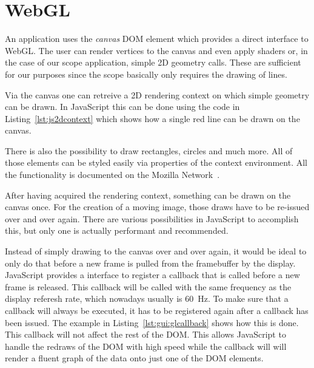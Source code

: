 \section{WebGL} %
\label{sec:app:gui:webgl}

An  application uses  the \emph{canvas}  DOM element  which provides  a direct
interface to WebGL. The user can render  vertices to the canvas and even apply
shaders  or,  in  the  case  of our  scope  application,  simple  2D  geometry
calls. These are  sufficient for our  purposes since the scope  basically only
requires the drawing of lines.

Via  the canvas  one  can retreive  a  2D rendering  context  on which  simple
geometry can  be drawn.   In JavaScript  this can  be done  using the  code in
Listing~\ref{lst:js2dcontext} which shows  how a single red line  can be drawn
on the canvas.


There  is  also   the  possibility  to  draw  rectangles,   circles  and  much
more. All  of those  elements  can  be styled  easily  via  properties of  the
context  environment. All  the  functionality  is documented  on  the  Mozilla
Network~\cite{moz:2dcontext}.

After having  acquired the rendering  context, something  can be drawn  on the
canvas once.   For the  creation of  a moving  image, those  draws have  to be
re-issued over and  over again. There are various  possibilities in JavaScript
to accomplish this, but only one is actually performant and recommended.

Instead of simply drawing to the canvas over and over again, it would be ideal
to only  do that  before a  new frame is  pulled from  the framebuffer  by the
display. JavaScript provides a interface to register a callback that is called
before  a  new frame  is  released. This  callback  will  be called  with  the
same  frequency  as the  display  referesh  rate,  which nowadays  usually  is
\SI{60}{\hertz}.  To make sure that a callback will always be executed, it has
to  be registered  again  after a  callback has  been  issued. The example  in
Listing~\ref{lst:gui:glcallback} shows  how this is done.   This callback will
not affect the  rest of the DOM. This allows JavaScript  to handle the redraws
of the DOM with high speed while  the callback will will render a fluent graph
of the data onto just one of the DOM elements.

